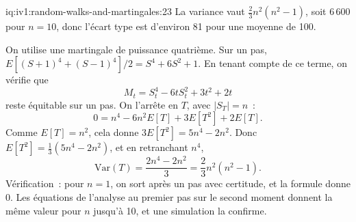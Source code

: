 \enlargethispage{-1\baselineskip}%
\begin{solution}{iq:iv1:random-walks-and-martingales:23}
La variance vaut $\tfrac23 n^2(n^2 - 1)$, soit 6\,600 pour $n = 10$, donc l'écart type est d'environ 81 pour une moyenne de 100.

On utilise une martingale de puissance quatrième. Sur un pas, $E[(S + 1)^4 + (S - 1)^4]/2 = S^4 + 6S^2 + 1$. En tenant compte de ce terme, on vérifie que
\[
M_t = S_t^4 - 6tS_t^2 + 3t^2 + 2t
\]
reste équitable sur un pas. On l'arrête en $T$, avec $|S_T| = n$~:
\[
0 = n^4 - 6n^2 E[T] + 3E[T^2] + 2E[T].
\]
Comme $E[T] = n^2$, cela donne $3E[T^2] = 5n^4 - 2n^2$. Donc $E[T^2] = \tfrac13(5n^4 - 2n^2)$, et en retranchant $n^4$,
\[
\mathrm{Var}(T) = \frac{2n^4 - 2n^2}{3} = \frac23 n^2(n^2 - 1).
\]
Vérification~: pour $n = 1$, on sort après un pas avec certitude, et la formule donne 0. Les équations de l'analyse au premier pas sur le second moment donnent la même valeur pour $n$ jusqu'à 10, et une simulation la confirme.

\end{solution}

